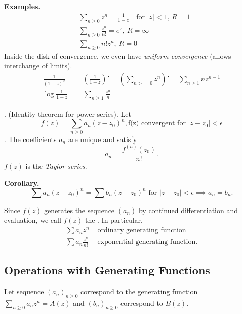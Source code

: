\textbf{Examples.}
\begin{align*}
    &\sum_{n≥0} z^n =
        \frac1{1-z}\quad\text{for $|z|<1$, } R = 1 \\
    &\sum_{n≥0} \frac{z^n}{n!} =
        e^z, ~R = ∞ \\
    &\sum_{n≥0} n! z^n, ~R = 0
\end{align*}
Inside the disk of convergence, we even have \emph{uniform convergence} (allows interchange of limits).
\begin{align*}
    \frac1{(1-z)^2}
    &= \left(\frac1{1-z}\right)'
    = \left(\sum_{n>=0} z^n\right)'
    = \sum_{n≥1} n z^{n-1} \\
    \log\frac{1}{1-z} &= \sum_{n≥1} \frac{z^n}{n}
\end{align*}

\Theorem. (Identity theorem for power series).
Let
\[
    f(z) = \sum_{n≥0} a_n (z-z_0)^n,
    \text{f(z) convergent for $|z-z_0| < \epsilon$}
\].
The coefficients $a_n$ are unique and satisfy
\[
    a_n = \frac{f^{(n)}(z_0)}{n!}.
\]
$f(z)$ is the \emph{Taylor series}.

\textbf{Corollary.}
\[
    \sum a_n (z-z_0)^n =
    \sum b_n (z-z_0)^n
    \text{ for } |z-z_0| < \epsilon
    \implies
    a_n = b_n.
\]

Since $f(z)$ generates the sequence $(a_n)$ by continued differentiation and evaluation, we call $f(z)$ the . In particular,
\begin{align*}
\sum a_n z^n & \text{ ordinary generating function} \\
\sum a_n \frac{z^n}{n!} & \text{ exponential generating function.}
\end{align*}


\subsection{Operations with Generating Functions}

Let sequence $(a_n)_{n≥0}$ correspond to the generating function $\displaystyle{\sum_{n≥0} a_n z^n = A(z)}$ and $(b_n)_{n≥0}$ correspond to $B(z)$.

